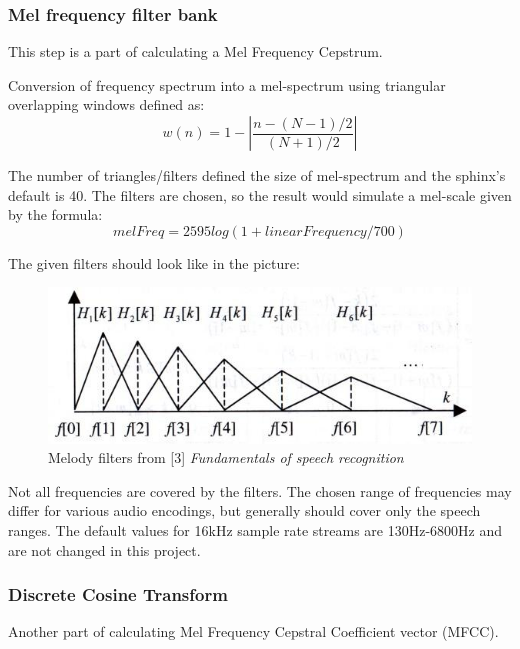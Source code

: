 \documentclass[12pt,a4paper,english]{article}
\begin{document}
\newpage

\subsubsection{Mel frequency filter bank}

This step is a part of calculating a Mel Frequency Cepstrum. \newline

Conversion of frequency spectrum into a mel-spectrum using triangular overlapping windows defined as:
\begin{equation}
    w(n) = 1 - |\frac{n - (N - 1)/2}{(N + 1)/2}|
\end{equation}


The number of triangles/filters defined the size of mel-spectrum and the sphinx's default is 40. \newline
The filters are chosen, so the result would simulate a mel-scale given by the formula:
\begin{equation}
    melFreq = 2595 log(1 + linearFrequency / 700)
\end{equation}

The given filters should look like in the picture:
\begin{figure}[hb]
    \centering
    \includegraphics[scale=0.4]{mel_filters.jpg}
    \caption[]{Melody filters from [3] \emph{Fundamentals of speech recognition}}
\end{figure}

Not all frequencies are covered by the filters.
The chosen range of frequencies may differ for various audio encodings,
but generally should cover only the speech ranges.
The default values for 16kHz sample rate streams are 130Hz-6800Hz and are not changed in this project.

\subsubsection{Discrete Cosine Transform}

Another part of calculating Mel Frequency Cepstral Coefficient vector (MFCC).  \newline
\end{document}

